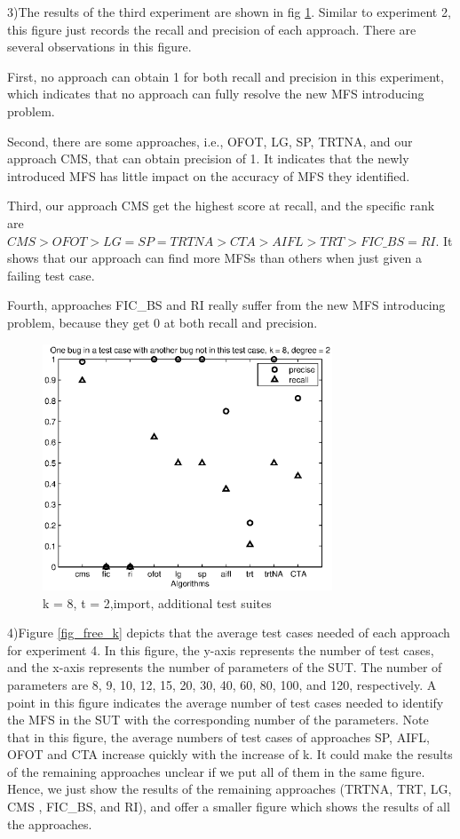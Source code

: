 \documentclass{sig-alternate-05-2015}
\begin{document}
{{{{3)The results of the third experiment are shown in fig \ref{fig_import}. Similar to experiment 2, this figure just records the recall and precision of each approach. There are several observations in this figure.

First, no approach can obtain 1 for both recall and precision in this experiment, which indicates that no approach can fully resolve the new MFS introducing problem.

Second, there are some approaches, i.e., OFOT, LG, SP, TRTNA, and our approach CMS, that can obtain precision of 1. It indicates that the newly introduced MFS has little impact on the accuracy of MFS they identified.

Third, our approach CMS get the highest score at recall, and the specific rank are $CMS > OFOT > LG = SP = TRTNA > CTA > AIFL > TRT > FIC\_BS = RI$. It shows that our approach can find more MFSs than others when just given a failing test case.

Fourth, approaches FIC\_BS and RI really suffer from the new MFS introducing problem, because they get 0 at both recall and precision.

\begin{figure}
 \centering
 \includegraphics[width=3.4in]{i-8-2.eps}
 \caption{k = 8, t = 2,import, additional test suites}
 \label{fig_import}
\end{figure}

4)Figure \ref{fig_free_k} depicts that the average test cases needed of each approach for experiment 4. In this figure, the y-axis represents the number of test cases, and the x-axis represents the number of parameters of the SUT. The number of parameters are 8, 9, 10, 12, 15, 20, 30, 40, 60, 80, 100, and 120, respectively.  A point in this figure indicates the average number of test cases needed to identify the MFS in the SUT with the corresponding number of the parameters. Note that in this figure, the average numbers of test cases of approaches SP, AIFL, OFOT and CTA increase quickly with the increase of k. It could make the results of the remaining approaches unclear if we put all of them in the same figure. Hence, we just show the results of the remaining approaches (TRTNA, TRT, LG, CMS , FIC\_BS, and RI), and offer a smaller figure  which shows the results of all the approaches.

}}}}
\end{document}
